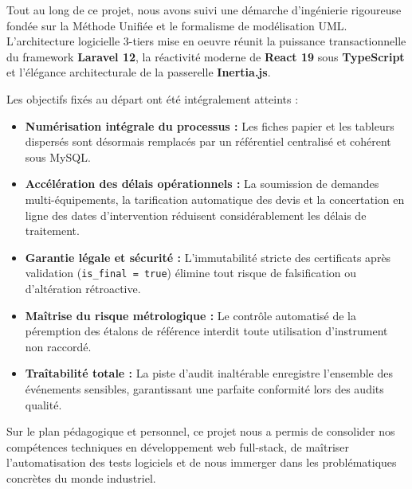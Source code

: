 \documentclass{bts-report}
\begin{document}
Tout au long de ce projet, nous avons suivi une d\'emarche d'ing\'enierie rigoureuse fond\'ee sur la M\'ethode Unifi\'ee et le formalisme de mod\'elisation UML. L'architecture logicielle 3-tiers mise en oeuvre r\'eunit la puissance transactionnelle du framework \textbf{Laravel 12}, la r\'eactivit\'e moderne de \textbf{React 19} sous \textbf{TypeScript} et l'\'el\'egance architecturale de la passerelle \textbf{Inertia.js}.

Les objectifs fix\'es au d\'epart ont \'et\'e int\'egralement atteints :
\begin{itemize}
  \item \textbf{Num\'erisation int\'egrale du processus :} Les fiches papier et les tableurs dispers\'es sont d\'esormais remplac\'es par un r\'ef\'erentiel centralis\'e et coh\'erent sous MySQL.
  \item \textbf{Acc\'el\'eration des d\'elais op\'erationnels :} La soumission de demandes multi-\'equipements, la tarification automatique des devis et la concertation en ligne des dates d'intervention r\'eduisent consid\'erablement les d\'elais de traitement.
  \item \textbf{Garantie l\'egale et s\'ecurit\'e :} L'immutabilit\'e stricte des certificats apr\`es validation (\texttt{is\_final = true}) \'elimine tout risque de falsification ou d'alt\'eration r\'etroactive.
  \item \textbf{Ma\^itrise du risque m\'etrologique :} Le contr\^ole automatis\'e de la p\'eremption des \'etalons de r\'ef\'erence interdit toute utilisation d'instrument non raccord\'e.
  \item \textbf{Tra\^itabilit\'e totale :} La piste d'audit inalt\'erable enregistre l'ensemble des \'ev\'enements sensibles, garantissant une parfaite conformit\'e lors des audits qualit\'e.
\end{itemize}

Sur le plan p\'edagogique et personnel, ce projet nous a permis de consolider nos comp\'etences techniques en d\'eveloppement web full-stack, de ma\^itriser l'automatisation des tests logiciels et de nous immerger dans les probl\'ematiques concr\`etes du monde industriel.
\end{document}
